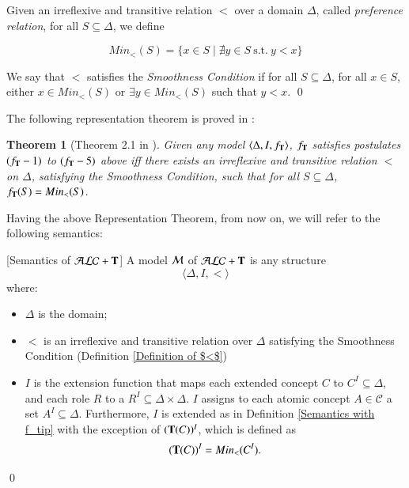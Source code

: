 \documentclass[a4paper, 11pt, oneside]{elsarticle}
\newcommand{\tip}{{\bf T}}
\newcommand{\alct}{\mathcal{ALC}+\tip}
\newcommand {\tc} {\mid}
\newcommand {\emme} {\begin{mathcal}M\end{mathcal}}
\newenvironment{definition}
{\begin{defi} \rm}{\qed \end{defi}}
\newtheorem{theorem}{Theorem}
\newcounter{posu}
\newtheorem{theorem}[posu]{Theorem}
\newtheorem{definition}[posu]{Definition}
\begin{document}
\begin{definition}\label{Definition of $<$} Given an irreflexive and transitive relation  $<$ over a domain
$\Delta$, called \emph{preference relation}, for all $S \subseteq \Delta$,
 we define

 $$Min_<(S)= \{x \in S \tc \nexists y \in S \ \mbox{s.t.} \ y < x \}$$


\noindent We say that $<$ satisfies the {\em Smoothness Condition}
if for all $S \subseteq \Delta$, for all $x \in S$, either $x \in Min_<(S)$ or
$\exists y \in  Min_<(S)$ such that $y < x$.
\end{definition}


\noindent The following representation theorem is proved in \cite{FI09}:

\begin{theorem}[Theorem 2.1 in \cite{FI09}]\label{rtrt} Given any model $\langle \Delta, I, f_\tip
\rangle$,
  $f_\tip$ satisfies postulates $(f_\tip-1)$ to $(f_\tip-5)$ above iff there exists  an irreflexive and transitive relation $<$ on $\Delta$,
satisfying the Smoothness Condition, such that for all $S \subseteq \Delta$, $f_\tip(S)
= Min_<(S)$.
\end{theorem}


\noindent Having the above Representation Theorem, from now on, we will refer
to the following semantics:

\begin{definition}[Semantics of $\alct$]\label{Semantics of T} A model $\emme$ of $\alct$ is any
structure $$\langle \Delta, I, < \rangle$$ where:

\begin{itemize}

\item $\Delta$ is the domain;

\item $<$ is an irreflexive and transitive
relation over $\Delta$ satisfying the Smoothness
Condition (Definition \ref{Definition of $<$})

\item $I$ is the extension function that
maps each  extended concept $C$ to $C^I \subseteq \Delta$, and
each role $R$ to a $R^I \subseteq \Delta \times \Delta$. $I$
assigns to each atomic concept $A \in \mathcal{C}$ a set $A^I
\subseteq \Delta$. Furthermore, $I$ is extended as in Definition
\ref{Semantics with f_tip} with the exception of $(\tip(C))^I$,
which is defined as
$$(\tip(C))^I = Min_<(C^I).$$
\end{itemize}

\end{definition}
\end{document}

